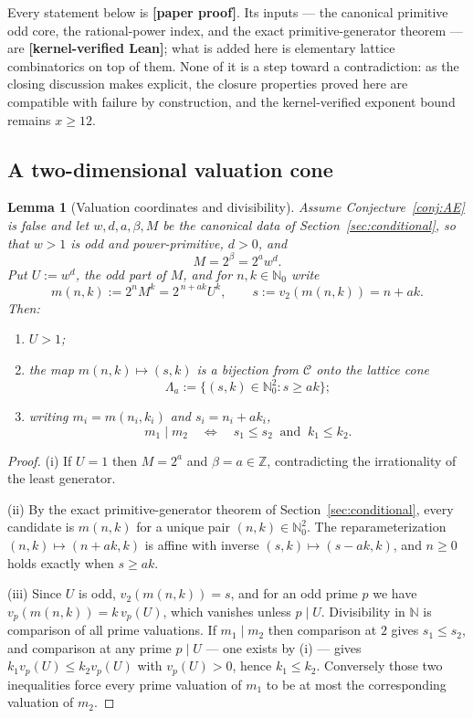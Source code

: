 \documentclass[11pt,oneside]{article}
\newtheorem{lemma}[theorem]{Lemma}
\theoremstyle{definition}
\theoremstyle{remark}
\newcommand{\N}{\mathbb N}
\newcommand{\Nzero}{\mathbb N_0}
\newcommand{\Z}{\mathbb Z}
\newcommand{\Cand}{\mathcal C}
\newcommand{\vpp}[2]{v_{#1}\!\left(#2\right)}
\newcommand{\statuslean}{\textcolor{leanblue}{\textbf{[kernel-verified Lean]}}}
\newcommand{\statusnew}{\textcolor{newgreen}{\textbf{[paper proof]}}}
\begin{document}
Every statement below is \statusnew{}.  Its inputs --- the canonical primitive odd core, the
rational-power index, and the exact primitive-generator theorem --- are \statuslean{}; what is
added here is elementary lattice combinatorics on top of them.  None of it is a step toward a
contradiction: as the closing discussion makes explicit, the closure properties proved here are
compatible with failure by construction, and the kernel-verified exponent bound remains
$x\ge12$.

\subsection{A two-dimensional valuation cone}

\begin{lemma}[Valuation coordinates and divisibility]
\label{lt:lem-cone}
Assume Conjecture~\ref{conj:AE} is false and let $w,d,a,\beta,M$ be the canonical data of
Section~\ref{sec:conditional}, so that $w>1$ is odd and power-primitive, $d>0$, and
\[
 M=2^{\beta}=2^aw^d .
\]
Put $U:=w^d$, the odd part of $M$, and for $n,k\in\Nzero$ write
\[
 m(n,k):=2^nM^k=2^{\,n+ak}U^k,
 \qquad s:=\vpp{2}{m(n,k)}=n+ak .
\]
Then:
\begin{enumerate}[label=\textup{(\roman*)}]
\item $U>1$;
\item the map $m(n,k)\mapsto(s,k)$ is a bijection from $\Cand$ onto the lattice cone
\[
 \Lambda_a:=\{(s,k)\in\Nzero^2:s\ge ak\};
\]
\item writing $m_i=m(n_i,k_i)$ and $s_i=n_i+ak_i$,
\begin{equation}
 m_1\mid m_2
 \quad\Longleftrightarrow\quad
 s_1\le s_2\ \text{ and }\ k_1\le k_2 .
 \label{lt:eq-divisibility-coordinates}
\end{equation}
\end{enumerate}
\end{lemma}

\begin{proof}
(i) If $U=1$ then $M=2^a$ and $\beta=a\in\Z$, contradicting the irrationality of the least
generator.

(ii) By the exact primitive-generator theorem of Section~\ref{sec:conditional}, every candidate
is $m(n,k)$ for a unique pair $(n,k)\in\Nzero^2$.  The reparameterization $(n,k)\mapsto(n+ak,k)$
is affine with inverse $(s,k)\mapsto(s-ak,k)$, and $n\ge0$ holds exactly when $s\ge ak$.

(iii) Since $U$ is odd, $\vpp{2}{m(n,k)}=s$, and for an odd prime $p$ we have
$\vpp{p}{m(n,k)}=k\,\vpp{p}{U}$, which vanishes unless $p\mid U$.  Divisibility in $\N$ is
comparison of all prime valuations.  If $m_1\mid m_2$ then comparison at $2$ gives $s_1\le s_2$,
and comparison at any prime $p\mid U$ --- one exists by (i) --- gives $k_1\vpp{p}{U}\le
k_2\vpp{p}{U}$ with $\vpp{p}{U}>0$, hence $k_1\le k_2$.  Conversely those two inequalities
force every prime valuation of $m_1$ to be at most the corresponding valuation of $m_2$.
\end{proof}
\end{document}
